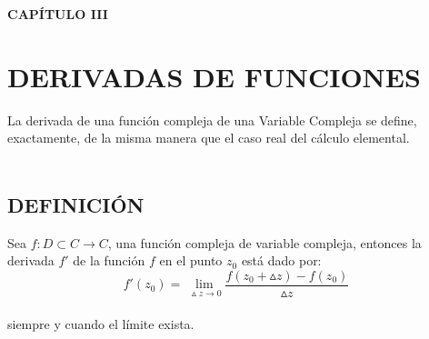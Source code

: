 \documentclass[10pt,a4paper]{book}
\begin{document}
\begin{center}
\textbf{CAPÍTULO III}
\end{center}
\section{ DERIVADAS DE FUNCIONES}
La derivada de una función compleja de una Variable Compleja se define, exactamente, de la misma manera que el caso real del cálculo elemental.
\\
\\
\subsection{DEFINICIÓN}
Sea $f:D \subset C \rightarrow C$, una función compleja de variable compleja, entonces la derivada $f'$ de la función $f$ en el punto $z_0$ está dado por:\\
$$f'(z_0)= \lim\limits_{\ \vartriangle z \rightarrow 0}\frac{f(z_0+\vartriangle z)-f(z_0)}{\vartriangle z}$$
\\
siempre y cuando el límite exista.
\end{document}
